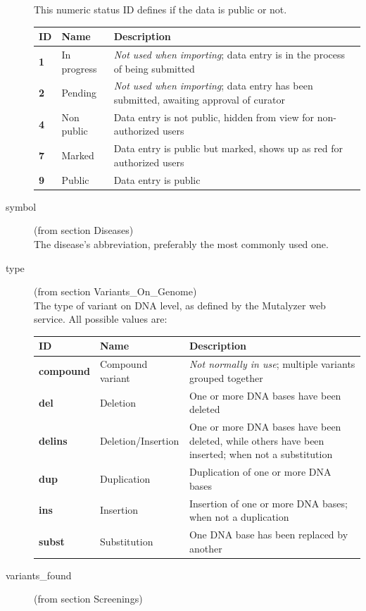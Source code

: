 \documentclass[a4paper,oneside,openany,12pt]{memoir}
\begin{document}
\begin{description}
  This numeric status ID defines if the data is public or not.\\
  \begin{tabular}{>{\bfseries}p{0.6cm} p{2.3cm} p{11.7cm}}
    ID & \textbf{Name} & \textbf{Description}\\ \hline \hline
    1 & In progress & \emph{Not used when importing}; data entry is in the process of being submitted\\ \hline
    2 & Pending & \emph{Not used when importing}; data entry has been submitted, awaiting approval of curator\\ \hline
    4 & Non public & Data entry is not public, hidden from view for non-authorized users\\ \hline
    7 & Marked & Data entry is public but marked, shows up as red for authorized users\\ \hline
    9 & Public & Data entry is public\\ \hline
  \end{tabular}
  \item[symbol] (from section Diseases) \hfill \\
  The disease's abbreviation, preferably the most commonly used one.
  \item[type] (from section Variants\_On\_Genome)\hfill \\
  The type of variant on DNA level, as defined by the Mutalyzer web service.
  All possible values are:\\
  \begin{tabular}{>{\bfseries}p{2.2cm} p{3.4cm} p{9cm}}
    ID & \textbf{Name} & \textbf{Description}\\ \hline \hline
    compound & Compound variant & \emph{Not normally in use}; multiple variants grouped together\\ \hline
    del & Deletion & One or more DNA bases have been deleted\\ \hline
    delins & Deletion/Insertion & One or more DNA bases have been deleted, while others have been inserted; when not a
      substitution\\ \hline
    dup & Duplication & Duplication of one or more DNA bases\\ \hline
    ins & Insertion & Insertion of one or more DNA bases; when not a duplication\\ \hline
    subst & Substitution & One DNA base has been replaced by another\\ \hline
  \end{tabular}
  \item[variants\_found] (from section Screenings)\hfill \\

\end{description}
\end{document}
